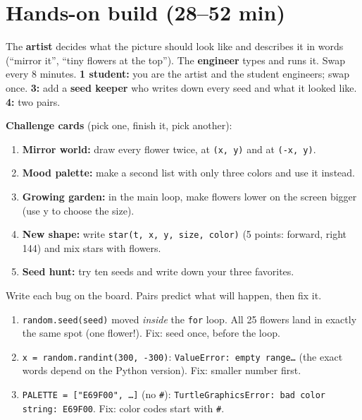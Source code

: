 \section{Hands-on build (28--52 min)}
\begin{pairroles}
The \textbf{artist} decides what the picture should look like and describes it in words
(\enquote{mirror it}, \enquote{tiny flowers at the top}). The \textbf{engineer} types and runs it.
Swap every 8 minutes. \textbf{1 student:} you are the artist and the student engineers; swap once.
\textbf{3:} add a \textbf{seed keeper} who writes down every seed and what it looked like. \textbf{4:} two pairs.
\end{pairroles}

\textbf{Challenge cards} (pick one, finish it, pick another):
\begin{enumerate}
  \item \textbf{Mirror world:} draw every flower twice, at \texttt{(x, y)} and at \texttt{(-x, y)}.
  \item \textbf{Mood palette:} make a second list with only three colors and use it instead.
  \item \textbf{Growing garden:} in the main loop, make flowers lower on the screen bigger (use y to choose the size).
  \item \textbf{New shape:} write \texttt{star(t, x, y, size, color)} (5 points: forward, right 144) and mix stars with flowers.
  \item \textbf{Seed hunt:} try ten seeds and write down your three favorites.
\end{enumerate}

\begin{bughunt}
Write each bug on the board. Pairs predict what will happen, then fix it.
\begin{enumerate}
  \item \texttt{random.seed(seed)} moved \emph{inside} the \texttt{for} loop. All 25 flowers land in exactly the same spot (one flower!). Fix: seed once, before the loop.
  \item \texttt{x = random.randint(300, -300)}: \texttt{ValueError: empty range\ldots} (the exact words depend on the Python version). Fix: smaller number first.
  \item \texttt{PALETTE = ["E69F00", …]} (no \texttt{\#}): \texttt{TurtleGraphicsError: bad color string: E69F00}. Fix: color codes start with \texttt{\#}.
\end{enumerate}
\end{bughunt}

